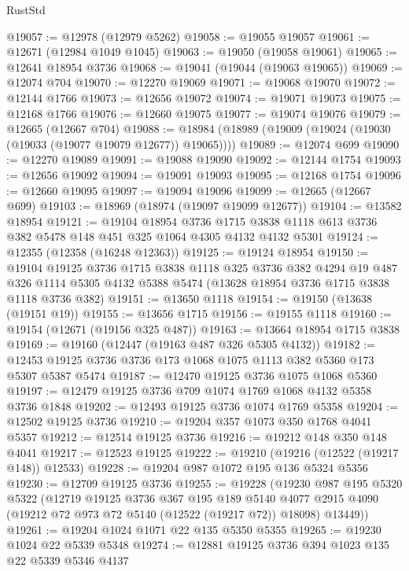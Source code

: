 \begin{lexlean}{RustStd}
\begin{coremodule}
@19057 := @12978 (@12979 @5262)
@19058 := @19055 @19057
@19061 := @12671 (@12984 @1049 @1045)
@19063 := @19050 (@19058 @19061)
@19065 := @12641 @18954 @3736
@19068 := @19041 (@19044 (@19063 @19065))
@19069 := @12074 @704
@19070 := @12270 @19069
@19071 := @19068 @19070
@19072 := @12144 @1766
@19073 := @12656 @19072
@19074 := @19071 @19073
@19075 := @12168 @1766
@19076 := @12660 @19075
@19077 := @19074 @19076
@19079 := @12665 (@12667 @704)
@19088 := @18984 (@18989 (@19009 (@19024 (@19030 (@19033 (@19077 @19079 @12677)) @19065))))
@19089 := @12074 @699
@19090 := @12270 @19089
@19091 := @19088 @19090
@19092 := @12144 @1754
@19093 := @12656 @19092
@19094 := @19091 @19093
@19095 := @12168 @1754
@19096 := @12660 @19095
@19097 := @19094 @19096
@19099 := @12665 (@12667 @699)
@19103 := @18969 (@18974 (@19097 @19099 @12677))
@19104 := @13582 @18954
@19121 := @19104
    @18954
    @3736
    @1715
    @3838
    @1118
    @613
    @3736
    @382
    @5478
    @148
    @451
    @325
    @1064
    @4305
    @4132
    @4132
    @5301
@19124 := @12355 (@12358 (@16248 @12363))
@19125 := @19124 @18954
@19150 := @19104
    @19125
    @3736
    @1715
    @3838
    @1118
    @325
    @3736
    @382
    @4294
    @19
    @487
    @326
    @1114
    @5305
    @4132
    @5388
    @5474
    (@13628 @18954 @3736 @1715 @3838 @1118 @3736 @382)
@19151 := @13650 @1118
@19154 := @19150 (@13638 (@19151 @19))
@19155 := @13656 @1715
@19156 := @19155 @1118
@19160 := @19154 (@12671 (@19156 @325 @487))
@19163 := @13664 @18954 @1715 @3838
@19169 := @19160 (@12447 (@19163 @487 @326 @5305 @4132))
@19182 := @12453 @19125 @3736 @3736 @173 @1068 @1075 @1113 @382 @5360 @173 @5307 @5387 @5474
@19187 := @12470 @19125 @3736 @1075 @1068 @5360
@19197 := @12479 @19125 @3736 @709 @1074 @1769 @1068 @4132 @5358 @3736 @1848
@19202 := @12493 @19125 @3736 @1074 @1769 @5358
@19204 := @12502 @19125 @3736
@19210 := @19204 @357 @1073 @350 @1768 @4041 @5357
@19212 := @12514 @19125 @3736
@19216 := @19212 @148 @350 @148 @4041
@19217 := @12523 @19125
@19222 := @19210 (@19216 (@12522 (@19217 @148)) @12533)
@19228 := @19204 @987 @1072 @195 @136 @5324 @5356
@19230 := @12709 @19125 @3736
@19255 := @19228
    (@19230
      @987
      @195
      @5320
      @5322
      (@12719
        @19125
        @3736
        @367
        @195
        @189
        @5140
        @4077
        @2915
        @4090
        (@19212 @72 @973 @72 @5140 (@12522 (@19217 @72)) @18098)
        @13449))
@19261 := @19204 @1024 @1071 @22 @135 @5350 @5355
@19265 := @19230 @1024 @22 @5339 @5348
@19274 := @12881 @19125 @3736 @394 @1023 @135 @22 @5339 @5346 @4137

\end{coremodule}
\end{lexlean}
